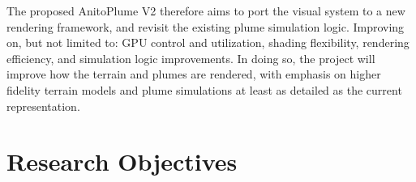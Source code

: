 The proposed AnitoPlume V2 therefore aims to port the visual system to a new rendering framework, and revisit the existing plume simulation logic. 
Improving on, but not limited to: GPU control and utilization, shading flexibility, rendering efficiency, and simulation logic improvements. 
In doing so, the project will improve how the terrain and plumes are rendered, with emphasis on higher fidelity terrain models and plume simulations at least as detailed as the current representation.






\section{Research Objectives}

